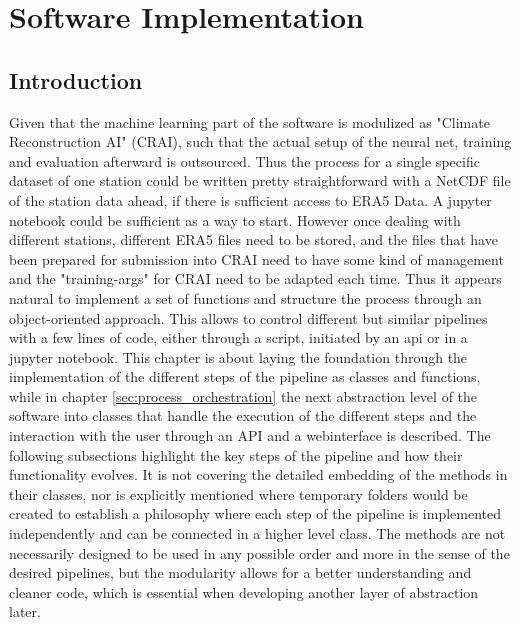 \section{Software Implementation}
\label{sec:implementation}

\subsection{Introduction}

Given that the machine learning part of the software is modulized as "Climate Reconstruction AI" (CRAI), such that the actual setup of the neural net, training and evaluation afterward is outsourced. Thus the process for a single specific dataset of one station could be written pretty straightforward with a NetCDF file of the station data ahead, if there is sufficient access to ERA5 Data. A jupyter notebook could be sufficient as a way to start. However once dealing with different stations, different ERA5 files need to be stored, and the files that have been prepared for submission into CRAI need to have some kind of management and the "training-args" for CRAI need to be adapted each time. Thus it appears natural to implement a set of functions and structure the process through an object-oriented approach. This allows to control different but similar pipelines with a few lines of code, either through a script, initiated by an api or in a jupyter notebook.
This chapter is about laying the foundation through the implementation of the different steps of the pipeline as classes and functions, while in chapter \autoref{sec:process_orchestration} the next abstraction level of the software into classes that handle the execution of the different steps and the interaction with the user through an API and a webinterface is described.
The following subsections highlight the key steps of the pipeline and how their functionality evolves. It is not covering the detailed embedding of the methods in their classes, nor is explicitly mentioned where temporary folders would be created to establish a philosophy where each step of the pipeline is implemented independently and can be connected in a higher level class. The methods are not necessarily designed to be used in any possible order and more in the sense of the desired pipelines, but the modularity allows for a better understanding and cleaner code, which is essential when developing another layer of abstraction later.

